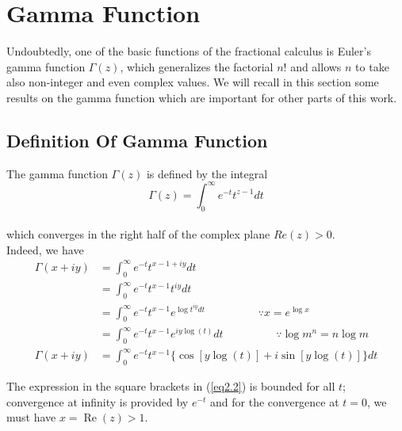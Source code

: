\documentclass[a4paper,14pt,oneside]{book}
\theoremstyle{plain}
\theoremstyle{definition}
\theoremstyle{remark}
\begin{document}
         \section{Gamma Function}
         \begin{center}
         
\begin{flushleft} 
\justify
\Large{
\par{Undoubtedly, one of the basic functions of the fractional calculus is Euler's gamma function $\Gamma(z)$, which generalizes the factorial $n!$  and allows $n$ to take also non-integer and even complex values. We will recall in this section some results on the gamma function which are important for other parts of this work.\\
\subsection{Definition Of Gamma Function}
The gamma function $\Gamma(z)$ is defined by the integral
\begin{equation}\label{eq:1.6}
\Gamma(z)=\int_{0}^{\infty} e^{-t} t^{z-1} d t
\end{equation}\\
which converges in the right half of the complex plane $Re(z)>0$.\\ 
Indeed, we have
\begin{align}\label{eq2.2}
\Gamma(x+i y) &=\int_{0}^{\infty} e^{-t} t^{x-1+i y} d t\nonumber\\
&=\int_{0}^{\infty} e^{-t} t^{x-1} t^{iy} dt\nonumber\\
&=\int_{0}^{\infty} e^{-t} t^{x-1} e^{\log t^{iy} dt} \hspace{2cm} \because x = e^{\log x} \nonumber\\
&=\int_{0}^{\infty} e^{-t} t^{x-1} e^{i y \log (t)} dt \hspace{2cm} \because \log m^{n} = n\log m\nonumber\\
\Gamma(x+i y)&=\int_{0}^{\infty} e^{-t} t^{x-1}\{\cos [y \log (t)]+i \sin [y \log (t)]\} d t
\end{align}

The expression in the square brackets in (\ref{eq2.2}) is bounded for all $t$; convergence at infinity is provided by $e^{-t}$ and for the convergence at $t=0$, we must have $x=\operatorname{Re}(z)>1.$}}

\end{flushleft}        \end{center}
\end{document}
